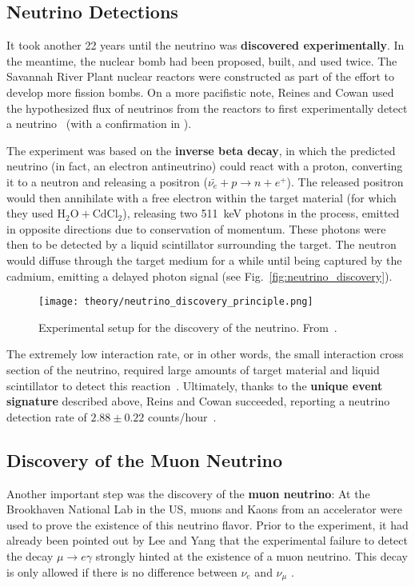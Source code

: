 \subsection{Neutrino Detections}
It took another 22 years until the neutrino was \textbf{discovered experimentally}. In the meantime, the nuclear bomb had been proposed, built, and used twice. The Savannah River Plant nuclear reactors were constructed as part of the effort to develop more fission bombs. On a more pacifistic note, Reines and Cowan used the hypothesized flux of neutrinos from the reactors to first experimentally detect a neutrino~\cite{Reines1956} (with a confirmation in ).

The experiment was based on the \textbf{inverse beta decay}, in which the predicted neutrino (in fact, an electron antineutrino) could react with a proton, converting it to a neutron and releasing a positron ($\bar{\nu_e} + p \rightarrow n + e^+$). The released positron would then annihilate with a free electron within the target material (for which they used $\text{H}_2\text{O} + \text{CdCl}_2$), releasing two \SI{511}{\kilo\eV} photons in the process, emitted in opposite directions due to conservation of momentum. These photons were then to be detected by a liquid scintillator surrounding the target. The neutron would diffuse through the target medium for a while until being captured by the cadmium, emitting a delayed photon signal (see Fig.~\ref{fig:neutrino_discovery}).

\begin{figure}[htb]
    \texttt{[image: theory/neutrino\_discovery\_principle.png]}
    \caption[Neutrino discovery schematic]{Experimental setup for the discovery of the neutrino. From~\cite{Reines1956}.}
\end{figure}

The extremely low interaction rate, or in other words, the small interaction cross section of the neutrino, required large amounts of target material and liquid scintillator to detect this reaction~\cite{Giunti2007}. Ultimately, thanks to the \textbf{unique event signature} described above, Reins and Cowan succeeded, reporting a neutrino detection rate of $2.88 \pm 0.22$ counts/hour~\cite{Reines1956}.

\subsection{Discovery of the Muon Neutrino}
Another important step was the discovery of the \textbf{muon neutrino}: At the Brookhaven National Lab in the US, muons and Kaons from an accelerator were used to prove the existence of this neutrino flavor. Prior to the experiment, it had already been pointed out by Lee and Yang that the experimental failure to detect the decay $\mu \rightarrow e \gamma$ strongly hinted at the existence of a muon neutrino. This decay is only allowed if there is no difference between $\nu_e$ and $\nu_\mu$ .

